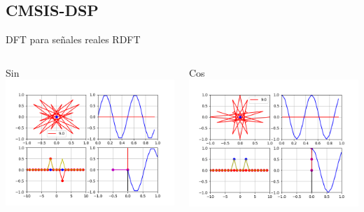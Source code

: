 \subsection{CMSIS-DSP}
\begin{frame}{DFT para señales reales RDFT}
   \begin{columns}[c]
      \begin{column}{.5\textwidth}
         Sin
         \centering\includegraphics[width=1.0\textwidth]{3_clase/euler_reales_sin}
      \end{column}
      \begin{column}{.5\textwidth}
         Cos
         \centering\includegraphics[width=1.0\textwidth]{3_clase/euler_reales_cos}
      \end{column}
   \end{columns}
\end{frame}
